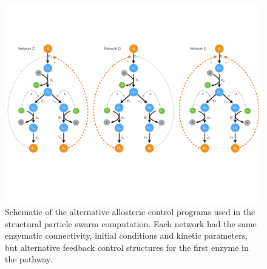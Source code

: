 \documentclass[12pt]{article}
\begin{document}
\begin{figure}
\centering
\includegraphics[width=1.0\textwidth]{./figs/Figure-6-AlternativeNetworks.pdf}
\caption{Schematic of the alternative allosteric control programs used in the structural particle swarm computation. 
Each network had the same enzymatic connectivity, initial conditions and kinetic parameters, 
but alternative feedback control structures for the first enzyme in the pathway.}\label{fig-alternative-networks}
\end{figure}

\clearpage
\end{document}

